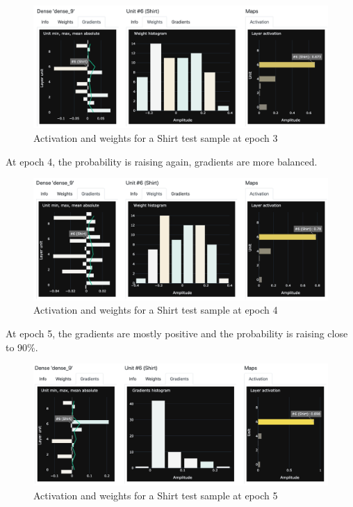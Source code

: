 \begin{figure}[H]
    \centering
    \includegraphics[scale=0.3]{images/dnn-viewer/TimeShirt_epoch3.png}
    \caption{Activation and weights for a Shirt test sample at epoch 3}
    \label{fig:dnn-viewer-time-shirt-epoch3}
\end{figure}

At epoch 4, the probability is raising again, gradients are more balanced.

\begin{figure}[H]
    \centering
    \includegraphics[scale=0.3]{images/dnn-viewer/TimeShirt_epoch4.png}
    \caption{Activation and weights for a Shirt test sample at epoch 4}
    \label{fig:dnn-viewer-time-shirt-epoch4}
\end{figure}

At epoch 5, the gradients are mostly positive and the probability is raising close to 90\%.

\begin{figure}[H]
    \centering
    \includegraphics[scale=0.3]{images/dnn-viewer/TimeShirt_epoch5.png}
    \caption{Activation and weights for a Shirt test sample at epoch 5}
    \label{fig:dnn-viewer-time-shirt-epoch5}
\end{figure}

